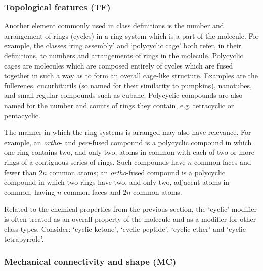 \documentclass[10pt]{bmc_article}
\newenvironment{bmcformat}{\baselineskip20pt\sloppy\setboolean{publ}{false}}{\baselineskip20pt\sloppy}
\begin{document}
\begin{bmcformat}
\subsubsection*{Topological features (TF)}

Another element commonly used in class definitions is the number and arrangement of rings (cycles) in a ring system which is a part of the molecule. For example, the classes `ring assembly' and `polycyclic cage' both refer, in their definitions, to numbers and arrangements of rings in the molecule. Polycyclic cages are molecules which are composed entirely of cycles which are fused together in such a way as to form an overall cage-like structure.  Examples are the fullerenes, cucurbiturils (so named for their similarity to pumpkins), nanotubes, and small regular compounds such as cubane.  Polycyclic compounds are also named for the number and counts of rings they contain, e.g. tetracyclic or  pentacyclic. 

The manner in which the ring systems is arranged may also have relevance. For example, an \textit{ortho}- and \textit{peri}-fused compound is a polycyclic compound in which one ring contains two, and only two, atoms in common with each of two or more rings of a contiguous series of rings. Such compounds have $n$ common faces and fewer than $2n$ common atoms; an \textit{ortho}-fused compound is a polycyclic compound in which two rings have two, and only two, adjacent atoms in common, having $n$ common faces and $2n$ common atoms.

Related to the chemical properties from the previous section, the `cyclic' modifier is often treated as an overall property of the molecule and as a modifier for other class types. Consider: `cyclic ketone', `cyclic peptide', %
 `cyclic ether' and `cyclic tetrapyrrole'.

\subsubsection*{Mechanical connectivity and shape (MC)}


\end{bmcformat}
\end{document}
